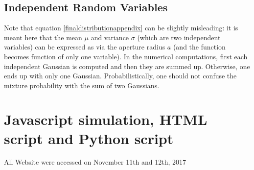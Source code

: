 \documentclass[twocolumn,12pt]{article}
\numberwithin{equation}{section} %
\numberwithin{equation}{section}
\begin{document}
\subsection{Independent Random Variables}
\label{randomvariables}
Note that equation \ref{finaldistributionappendix} can be slightly misleading: it is meant here that the mean $\mu$ and variance $\sigma$ (which are two independent variables) can be expressed as via the aperture radius $a$ (and the function becomes function of only one variable). In the numerical computations, first each independent Gaussian is computed and then they are summed up. Otherwise, one ends up with only one Gaussian. Probabilistically, one should not confuse the mixture probability with the sum of two Gaussians.

\onecolumn
\section{Javascript simulation, HTML script and Python script}







\twocolumn

\newpage




All Website were accessed on November 11th and 12th, 2017
\end{document}
